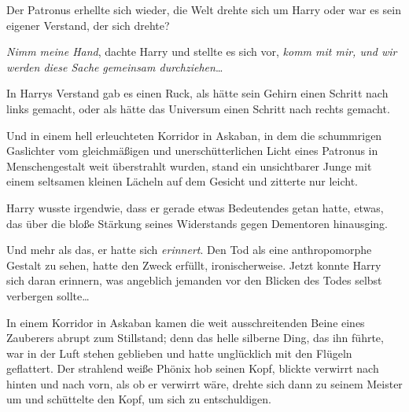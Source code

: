 Der Patronus erhellte sich wieder, die Welt drehte sich um Harry oder war es sein eigener Verstand, der sich drehte?

\emph{Nimm meine Hand}, dachte Harry und stellte es sich vor, \emph{komm mit mir, und wir werden diese Sache} \emph{gemeinsam durchziehen}…

In Harrys Verstand gab es einen Ruck, als hätte sein Gehirn einen Schritt nach links gemacht, oder als hätte das Universum einen Schritt nach rechts gemacht.

Und in einem hell erleuchteten Korridor in Askaban, in dem die schummrigen Gaslichter vom gleichmäßigen und unerschütterlichen Licht eines Patronus in Menschengestalt weit überstrahlt wurden, stand ein unsichtbarer Junge mit einem seltsamen kleinen Lächeln auf dem Gesicht und zitterte nur leicht.

Harry wusste irgendwie, dass er gerade etwas Bedeutendes getan hatte, etwas, das über die bloße Stärkung seines Widerstands gegen Dementoren hinausging.

Und mehr als das, er hatte sich \emph{erinnert}. Den Tod als eine anthropomorphe Gestalt zu sehen, hatte den Zweck erfüllt, ironischerweise. Jetzt konnte Harry sich daran erinnern, was angeblich jemanden vor den Blicken des Todes selbst verbergen sollte…

\later

In einem Korridor in Askaban kamen die weit ausschreitenden Beine eines Zauberers abrupt zum Stillstand; denn das helle silberne Ding, das ihn führte, war in der Luft stehen geblieben und hatte unglücklich mit den Flügeln geflattert. Der strahlend weiße Phönix hob seinen Kopf, blickte verwirrt nach hinten und nach vorn, als ob er verwirrt wäre, drehte sich dann zu seinem Meister um und schüttelte den Kopf, um sich zu entschuldigen.

